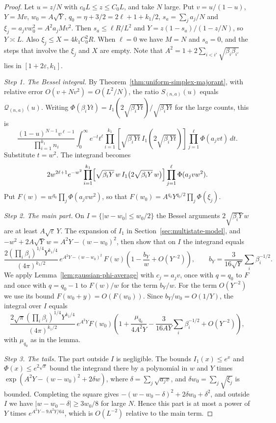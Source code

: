 \begin{proof}
Let $u=z/N$ with $c_0L\le z\le C_0L$, and take $N$ large. Put
$v=u/(1-u)$, $Y=Mv$, $w_0=A\sqrt Y$, $q_0=\eta+3/2=2\ell+1+k_1/2$,
$s_a=\sum_ja_j/N$ and $\xi_j=a_jvw_0^2=A^2a_jMv^2$. Then $s_a\le\ell R/L^2$
and $Y=z(1-s_a)/(1-z/N)$, so $Y\asymp L$. Also $\xi_j\le X=4k_1C_0^2R$. When
$\ell=0$ we have $M=N$ and $s_a=0$, and the steps that involve the $\xi_j$ and
$X$ are empty. Note that $A^2=1+2\sum_{i<i'}\sqrt{\beta_i\beta_{i'}}$ lies in
$[1+2\varepsilon,k_1]$.

\emph{Step 1. The Bessel integral.} By
Theorem~\ref{thm:uniform-simplex-majorant}, with relative error
$O(v+Nv^2)=O(L^2/N)$, the ratio $S_{(n,a)}(u)$ equals $\mathcal Q_{(n,a)}(u)$.
Writing $\Phi(\beta_iYt)=I_1(2\sqrt{\beta_iYt})/\sqrt{\beta_iYt}$ for the large
counts, this is
\begin{equation}\label{eq:simplex-mixed-integral}
\frac{(1-u)^{N-1}v^{\ell-1}}{\prod_{i=1}^{k_1} n_i}
\int_0^\infty e^{-t}t^\ell
\prod_{i=1}^{k_1}\left[\sqrt{\beta_iYt}\,
I_1(2\sqrt{\beta_iYt})\right]
\prod_{j=1}^\ell\Phi(a_jvt)\,dt.
\end{equation}
Substitute $t=w^2$. The integrand becomes
\[
2w^{2\ell+1}e^{-w^2}\prod_{i=1}^{k_1}\Bigl[\sqrt{\beta_iY}\,w\,
I_1\bigl(2\sqrt{\beta_iY}\,w\bigr)\Bigr]\prod_{j=1}^\ell\Phi(a_jvw^2).
\]
Put $F(w)=w^{q_0}\prod_j\Phi(a_jvw^2)$, so that
$F(w_0)=A^{q_0}Y^{q_0/2}\prod_j\Phi(\xi_j)$.

\emph{Step 2. The main part.} On $I=\{|w-w_0|\le w_0/2\}$ the Bessel arguments
$2\sqrt{\beta_iY}\,w$ are at least $A\sqrt\varepsilon\,Y$. The expansion of
$I_1$ in Section~\ref{sec:multistate-model}, and
$-w^2+2A\sqrt Y\,w=A^2Y-(w-w_0)^2$, then show that on $I$ the integrand equals
\[
\frac{2(\prod_i\beta_i)^{1/4}Y^{k_1/4}}{(4\pi)^{k_1/2}}\,
e^{A^2Y-(w-w_0)^2}\,F(w)
\left(1-\frac{b_Y}w+O(Y^{-2})\right),\qquad
b_Y=\frac3{16\sqrt Y}\sum_i\beta_i^{-1/2}.
\]
We apply Lemma~\ref{lem:gaussian-phi-average} with $c_j=a_jv$, once with
$q=q_0$ to $F$ and once with $q=q_0-1$ to $F(w)/w$ for the term $b_Y/w$.
For the term $O(Y^{-2})$ we use its bound $F(w_0+y)=O(F(w_0))$. Since
$b_Y/w_0=O(1/Y)$, the integral over $I$ equals
\[
\frac{2\sqrt\pi(\prod_i\beta_i)^{1/4}Y^{k_1/4}}{(4\pi)^{k_1/2}}\,
e^{A^2Y}F(w_0)
\left(1+\frac{\mu_{q_0}}{4A^2Y}-\frac{3}{16AY}\sum_i\beta_i^{-1/2}
+O(Y^{-2})\right),
\]
with $\mu_{q_0}$ as in the lemma.

\emph{Step 3. The tails.} The part outside $I$ is negligible. The bounds
$I_1(x)\le e^x$ and $\Phi(x)\le e^{2\sqrt x}$ bound the integrand there by a
polynomial in $w$ and $Y$ times $\exp(A^2Y-(w-w_0)^2+2\delta w)$, where
$\delta=\sum_j\sqrt{a_jv}$, and $\delta w_0=\sum_j\sqrt{\xi_j}$ is
bounded. Completing the square gives $-(w-w_0-\delta)^2+2\delta w_0+\delta^2$,
and outside $I$ we have $|w-w_0-\delta|\ge3w_0/8$ for large $N$. Hence this
part is at most a power of $Y$ times $e^{A^2Y-9A^2Y/64}$, which is
$O(L^{-2})$ relative to the main term.


\end{proof}
